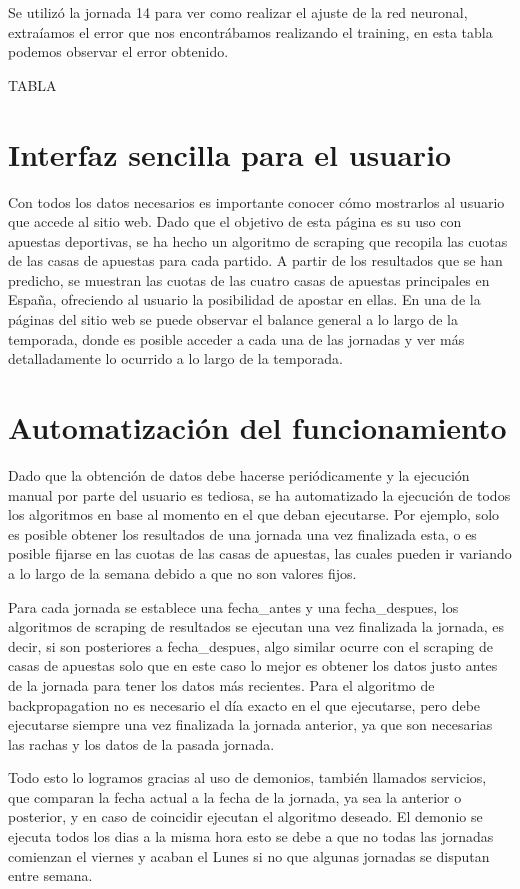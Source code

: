 Se utilizó la jornada 14 para ver como realizar el ajuste de la red neuronal, extraíamos el error que nos encontrábamos realizando el training, en esta tabla podemos observar el error obtenido.



TABLA


\section{Interfaz sencilla para el usuario}

Con todos los datos necesarios es importante conocer cómo mostrarlos al usuario que accede al sitio web. Dado que el objetivo de esta página es su uso con apuestas deportivas, se ha hecho un algoritmo de scraping que recopila las cuotas de las casas de apuestas para cada partido.
A partir de los resultados que se han predicho, se muestran las cuotas de las cuatro casas de apuestas principales en España, ofreciendo al usuario la posibilidad de apostar en ellas.
En una de la páginas del sitio web se puede observar el balance general a lo largo de la temporada, donde es posible acceder a cada una de las jornadas y ver más detalladamente lo ocurrido a lo largo de la temporada.

\section{Automatización del funcionamiento}

Dado que la obtención de datos debe hacerse periódicamente y la ejecución manual por parte del usuario es tediosa, se ha automatizado la ejecución de todos los algoritmos en base al momento en el que deban ejecutarse. Por ejemplo, solo es posible obtener los resultados de una jornada una vez finalizada esta, o es posible fijarse en las cuotas de las casas de apuestas, las cuales pueden ir variando a lo largo de la semana debido a que no son valores fijos.

Para cada jornada se establece una fecha\_antes y una fecha\_despues, los algoritmos de scraping de resultados se ejecutan una vez finalizada la jornada, es decir, si son posteriores a fecha\_despues, algo similar ocurre con el scraping de casas de apuestas solo que en este caso lo mejor es obtener los datos justo antes de la jornada para tener los datos más recientes. Para el algoritmo de backpropagation no es necesario el día exacto en el que ejecutarse, pero debe ejecutarse siempre una vez finalizada la jornada anterior, ya que son necesarias las rachas y los datos de la pasada jornada.

Todo esto lo logramos gracias al uso de demonios, también llamados servicios, que comparan la fecha actual a la fecha de la jornada, ya sea la anterior o posterior, y en caso de coincidir ejecutan el algoritmo deseado. El demonio se ejecuta todos los dias a la misma hora esto se debe a que no todas las jornadas comienzan el viernes y acaban el Lunes si no que algunas jornadas se disputan entre semana.